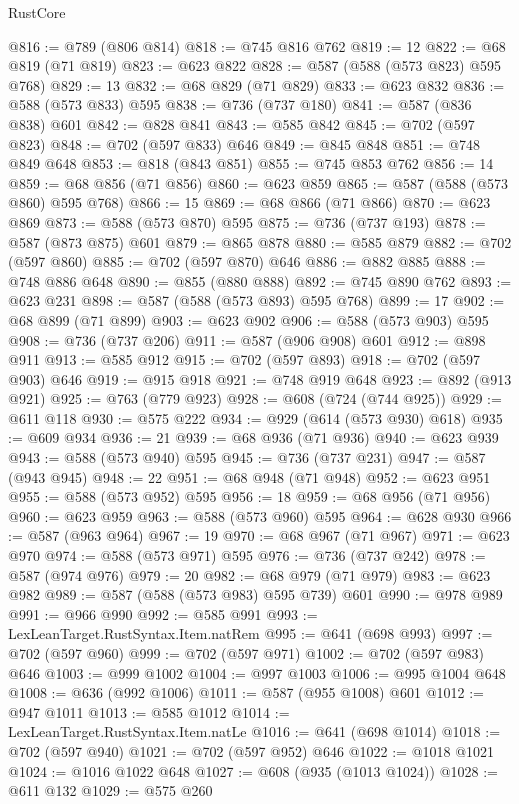 \begin{lexlean}{RustCore}
\begin{coremodule}
@816 := @789 (@806 @814)
@818 := @745 @816 @762
@819 := 12
@822 := @68 @819 (@71 @819)
@823 := @623 @822
@828 := @587 (@588 (@573 @823) @595 @768)
@829 := 13
@832 := @68 @829 (@71 @829)
@833 := @623 @832
@836 := @588 (@573 @833) @595
@838 := @736 (@737 @180)
@841 := @587 (@836 @838) @601
@842 := @828 @841
@843 := @585 @842
@845 := @702 (@597 @823)
@848 := @702 (@597 @833) @646
@849 := @845 @848
@851 := @748 @849 @648
@853 := @818 (@843 @851)
@855 := @745 @853 @762
@856 := 14
@859 := @68 @856 (@71 @856)
@860 := @623 @859
@865 := @587 (@588 (@573 @860) @595 @768)
@866 := 15
@869 := @68 @866 (@71 @866)
@870 := @623 @869
@873 := @588 (@573 @870) @595
@875 := @736 (@737 @193)
@878 := @587 (@873 @875) @601
@879 := @865 @878
@880 := @585 @879
@882 := @702 (@597 @860)
@885 := @702 (@597 @870) @646
@886 := @882 @885
@888 := @748 @886 @648
@890 := @855 (@880 @888)
@892 := @745 @890 @762
@893 := @623 @231
@898 := @587 (@588 (@573 @893) @595 @768)
@899 := 17
@902 := @68 @899 (@71 @899)
@903 := @623 @902
@906 := @588 (@573 @903) @595
@908 := @736 (@737 @206)
@911 := @587 (@906 @908) @601
@912 := @898 @911
@913 := @585 @912
@915 := @702 (@597 @893)
@918 := @702 (@597 @903) @646
@919 := @915 @918
@921 := @748 @919 @648
@923 := @892 (@913 @921)
@925 := @763 (@779 @923)
@928 := @608 (@724 (@744 @925))
@929 := @611 @118
@930 := @575 @222
@934 := @929 (@614 (@573 @930) @618)
@935 := @609 @934
@936 := 21
@939 := @68 @936 (@71 @936)
@940 := @623 @939
@943 := @588 (@573 @940) @595
@945 := @736 (@737 @231)
@947 := @587 (@943 @945)
@948 := 22
@951 := @68 @948 (@71 @948)
@952 := @623 @951
@955 := @588 (@573 @952) @595
@956 := 18
@959 := @68 @956 (@71 @956)
@960 := @623 @959
@963 := @588 (@573 @960) @595
@964 := @628 @930
@966 := @587 (@963 @964)
@967 := 19
@970 := @68 @967 (@71 @967)
@971 := @623 @970
@974 := @588 (@573 @971) @595
@976 := @736 (@737 @242)
@978 := @587 (@974 @976)
@979 := 20
@982 := @68 @979 (@71 @979)
@983 := @623 @982
@989 := @587 (@588 (@573 @983) @595 @739) @601
@990 := @978 @989
@991 := @966 @990
@992 := @585 @991
@993 := LexLeanTarget.RustSyntax.Item.natRem
@995 := @641 (@698 @993)
@997 := @702 (@597 @960)
@999 := @702 (@597 @971)
@1002 := @702 (@597 @983) @646
@1003 := @999 @1002
@1004 := @997 @1003
@1006 := @995 @1004 @648
@1008 := @636 (@992 @1006)
@1011 := @587 (@955 @1008) @601
@1012 := @947 @1011
@1013 := @585 @1012
@1014 := LexLeanTarget.RustSyntax.Item.natLe
@1016 := @641 (@698 @1014)
@1018 := @702 (@597 @940)
@1021 := @702 (@597 @952) @646
@1022 := @1018 @1021
@1024 := @1016 @1022 @648
@1027 := @608 (@935 (@1013 @1024))
@1028 := @611 @132
@1029 := @575 @260

\end{coremodule}
\end{lexlean}
